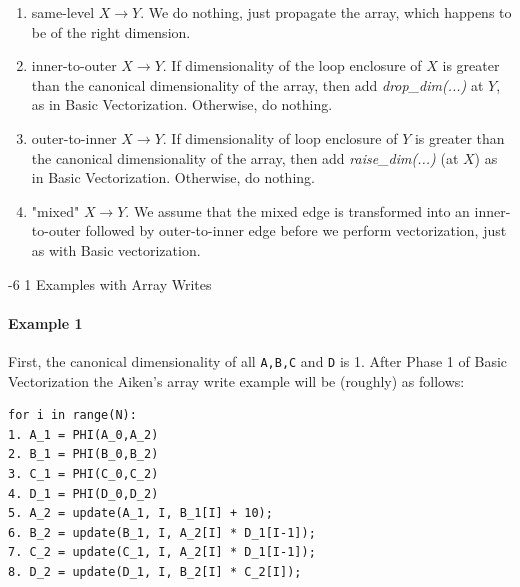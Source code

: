 \documentclass[sigconf, screen, natbib=false, dvipsnames, table]{acmart}
\makeatletter
\renewcommand{\subsubsection}{\@startsection{subsubsection}{3}{\z@}%
                        {-6\p@ \@plus -4\p@ \@minus -4\p@}%
                        {1\p@ \@plus 1\p@ \@minus 0\p@}%
                        {\normalfont\normalsize\bfseries\boldmath}}
\theoremstyle{definition}
\makeatother
\begin{document}
\begin{enumerate}

\item same-level $X \rightarrow Y$. We do nothing, just propagate the array, which happens to be of the right dimension. 

\item inner-to-outer $X \rightarrow Y$. If dimensionality of the loop enclosure of $X$ is greater than the canonical dimensionality of the array, then add \emph{drop\_dim(...)} at $Y$, as in Basic Vectorization. Otherwise, do nothing. 

\item outer-to-inner $X \rightarrow Y$. If dimensionality of loop enclosure of $Y$ is greater than the canonical dimensionality of the array, then add \emph{raise\_dim(...)} (at $X$) as in Basic Vectorization. Otherwise, do nothing.

\item "mixed" $X \rightarrow Y$. We assume that the mixed edge is transformed into an inner-to-outer followed by outer-to-inner edge before we perform vectorization, just as with Basic vectorization.

\end{enumerate}

\subsubsection{Examples with Array Writes}

\paragraph{Example 1}

First, the canonical dimensionality of all \texttt{A,B,C} and \texttt{D} is 1. 
After Phase 1 of Basic Vectorization the Aiken's array write example will be (roughly) as follows:

{\small
\begin{verbatim}
for i in range(N):
1. A_1 = PHI(A_0,A_2)
2. B_1 = PHI(B_0,B_2)
3. C_1 = PHI(C_0,C_2)
4. D_1 = PHI(D_0,D_2)
5. A_2 = update(A_1, I, B_1[I] + 10); 
6. B_2 = update(B_1, I, A_2[I] * D_1[I-1]);
7. C_2 = update(C_1, I, A_2[I] * D_1[I-1]);
8. D_2 = update(D_1, I, B_2[I] * C_2[I]);
\end{verbatim}
}
\end{document}
